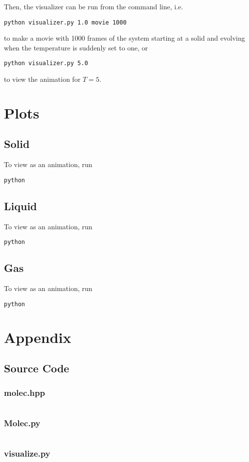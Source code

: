 \documentclass[12pt]{article}
\begin{document}
Then, the visualizer can be run from the command line, i.e.

\begin{verbatim}
python visualizer.py 1.0 movie 1000
\end{verbatim}

to make a movie with 1000 frames of the system starting at a solid and
evolving when the temperature is suddenly set to one, or

\begin{verbatim}
python visualizer.py 5.0
\end{verbatim}

to view the animation for $T = 5$.

\section{Plots}

\subsection{Solid}

To view as an animation, run

\begin{verbatim}
python 
\end{verbatim}

\subsection{Liquid}

To view as an animation, run

\begin{verbatim}
python
\end{verbatim}

\subsection{Gas}

To view as an animation, run

\begin{verbatim}
python 
\end{verbatim}

\section*{Appendix}

\subsection*{Source Code}

\subsubsection*{molec.hpp}

\inputminted{c++}{molec.hpp}

\newpage

\subsubsection*{Molec.py}

\inputminted{python}{Molec.py}

\newpage

\subsubsection*{visualize.py}
\end{document}
